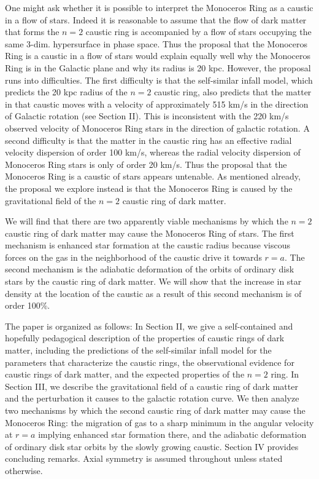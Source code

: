 \documentclass[aps,prd,preprint,tightenlines,floatfix,showpacs,groupedaddress]{revtex4}
\begin{document}
One might ask whether it is possible to interpret the Monoceros Ring 
as a caustic in a flow of stars.  Indeed it is reasonable to assume that
the flow of dark matter that forms the $n=2$ caustic ring is accompanied
by a flow of stars occupying the same 3-dim. hypersurface in phase space.
Thus the proposal that the Monoceros Ring is a caustic in a flow of
stars would explain equally well why the Monoceros Ring is in the 
Galactic plane and why its radius is 20 kpc.  However, the proposal 
runs into difficulties.  The first difficulty is that the self-similar 
infall model, which predicts the 20 kpc radius of the $n=2$ caustic 
ring, also predicts that the matter in that caustic moves with a 
velocity of approximately 515 km/s in the direction of Galactic 
rotation (see Section II).  This is inconsistent with the 220 km/s 
observed velocity of Monoceros Ring stars in the direction of galactic 
rotation.  A second difficulty is that the matter in the caustic 
ring has an effective radial velocity dispersion of order 100 km/s, 
whereas the radial velocity dispersion of Monoceros Ring stars is 
only of order 20 km/s.  Thus the proposal that the Monoceros Ring 
is a caustic of stars appears untenable.  As mentioned already, the
proposal we explore instead is that the Monoceros Ring is caused by 
the gravitational field of the $n=2$ caustic ring of dark matter.

We will find that there are two apparently viable mechanisms 
by which the $n=2$ caustic ring of dark matter may cause the 
Monoceros Ring of stars.  The first mechanism is enhanced 
star formation at the caustic radius because viscous forces 
on the gas in the neighborhood of the caustic drive it 
towards $r = a$.  The second mechanism is the adiabatic 
deformation of the orbits of ordinary disk stars by the 
caustic ring of dark matter.  We will show that the increase 
in star density at the location of the caustic as a result of 
this second mechanism is of order 100\%.

The paper is organized as follows: In Section II, we give 
a self-contained and hopefully pedagogical description of 
the properties of caustic rings of dark matter, including the 
predictions of the self-similar infall model for the parameters 
that characterize the caustic rings, the observational evidence 
for caustic rings of dark matter, and the expected properties  
of the $n = 2$ ring.  In Section III, we describe the gravitational 
field of a caustic ring of dark matter and the perturbation it 
causes to the galactic rotation curve.  We then analyze two 
mechanisms by which the second caustic ring of dark matter 
may cause the Monoceros Ring: the migration of gas to a sharp 
minimum in the angular velocity at $r = a$ implying enhanced 
star formation there, and the adiabatic deformation of ordinary 
disk star orbits by the slowly growing caustic.  Section IV 
provides concluding remarks.  Axial symmetry is assumed 
throughout unless stated otherwise.
\end{document}
